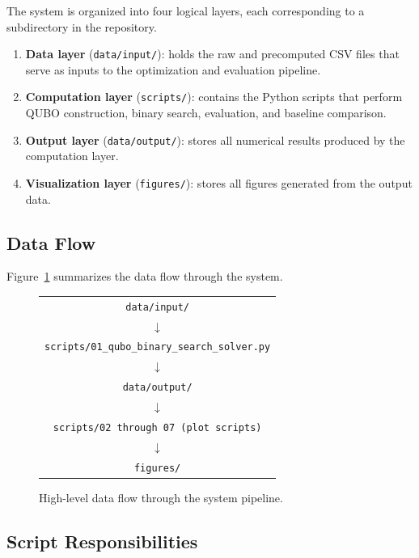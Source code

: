 \documentclass[12pt,a4paper]{article}
\begin{document}
The system is organized into four logical layers, each corresponding to a
subdirectory in the repository.

\begin{enumerate}[leftmargin=2em]
    \item \textbf{Data layer} (\texttt{data/input/}): holds the raw and
          precomputed CSV files that serve as inputs to the optimization and
          evaluation pipeline.
    \item \textbf{Computation layer} (\texttt{scripts/}): contains the Python
          scripts that perform QUBO construction, binary search, evaluation,
          and baseline comparison.
    \item \textbf{Output layer} (\texttt{data/output/}): stores all
          numerical results produced by the computation layer.
    \item \textbf{Visualization layer} (\texttt{figures/}): stores all
          figures generated from the output data.
\end{enumerate}

\subsection{Data Flow}

Figure~\ref{fig:dataflow} summarizes the data flow through the system.

\begin{figure}[h!]
\centering
\begin{tabular}{c}
\texttt{data/input/} \\
$\downarrow$ \\
\texttt{scripts/01\_qubo\_binary\_search\_solver.py} \\
$\downarrow$ \\
\texttt{data/output/} \\
$\downarrow$ \\
\texttt{scripts/02 through 07 (plot scripts)} \\
$\downarrow$ \\
\texttt{figures/}
\end{tabular}
\caption{High-level data flow through the system pipeline.}
\label{fig:dataflow}
\end{figure}

\subsection{Script Responsibilities}
\end{document}
